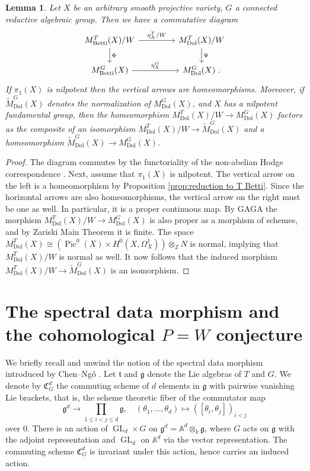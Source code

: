 \documentclass[11pt, a4paper]{amsart}
\newtheorem{lemma}[theorem]{Lemma}
\theoremstyle{definition}
\theoremstyle{myitemstyle}
\newcommand{\Z}{\mathbb{Z}}
\newcommand{\A}{\mathbb{A}}
\DeclareMathOperator{\Pic}{Pic}
\DeclareMathOperator{\GL}{GL}
\newcommand{\Dol}{{\mathrm{Dol}}}
\newcommand{\Betti}{{\mathrm{Betti}}}
\begin{document}
\begin{lemma}\label{lem:non-ab Hodge reduction}
Let $X$ be an arbitrary smooth projective variety, $G$ a connected reductive algebraic group. Then we have a commutative diagram
\begin{equation}
\label{eq:eta for reductive group via tori}
\begin{tikzcd}
    M^{T}_\Betti(X)/W
    \arrow[r,"\eta_X^{T}/W"]
    \arrow[d,"\Phi"]&[2em]
        M^{T}_\Dol(X)/W
        \arrow[d,"\Psi"]\\
    M^G_\Betti(X)
    \arrow[r,"\eta_X^G"]&
        M^G_\Dol(X) \ .
\end{tikzcd}
\end{equation}
If $\pi_1(X)$ is nilpotent then the vertical arrows are homeomorphisms. Moreover, if $\widetilde M^G_\Dol(X)$ denotes the normalization of $M^G_\Dol(X)$, and $X$ has a nilpotent fundamental group, then the  homeomorphism $M^T_\Dol(X)/W\to M^G_\Dol(X)$ factors as the composite of an isomorphism $M^T_\Dol(X)/W\to \widetilde M^G_\Dol(X)$ and a homeomorphism $\widetilde M^G_\Dol(X)\to M^G_\Dol(X)$.
\end{lemma}
\begin{proof}
The diagram commutes by  the functoriality of the non-abelian Hodge correspondence \cite[\S6]{Simpson_nonabelianHodge}.
Next, assume that $\pi_1(X)$ is nilpotent. The vertical arrow on the left is a homeomorphism by Proposition \ref{prop:reduction to T Betti}. Since the horizontal arrows are also homeomorphisms, the vertical arrow on the right must be  one as well. In particular, it is a proper continuous map. By GAGA the morphism $M^T_\Dol(X)/W\to M^G_\Dol(X)$ is also proper as a morphism of schemes, and by Zariski Main Theorem it is finite. The space $M^T_\Dol(X)\cong (\Pic^0(X)\times H^0(X,\Omega^1_X))\otimes_\Z N$ is normal, implying that $M^T_\Dol(X)/W$ is normal as well. It now follows that the induced morphism $M^T_\Dol(X)/W\to \widetilde M^G_\Dol(X)$ is an isomorphism.
\end{proof}

\section{The spectral data morphism and the cohomological $P=W$ conjecture}

We briefly recall and unwind the notion of the spectral data morphism introduced by  Chen--Ng\^o \cite{CN20}.  Let $\mathfrak{t}$ and $\mathfrak{g}$ denote the Lie algebras of $T$ and $G$. We denote by $\mathfrak C_G^d$ the commuting scheme of $d$ elements in $\mathfrak g$ with pairwise vanishing Lie brackets, that is, the scheme theoretic fiber  of the commutator map 
\[
    \mathfrak{g}^d\rightarrow \prod_{1\leq i<j\leq d}\mathfrak{g},\quad (\theta_1,\ldots,\theta_d)\mapsto ([\theta_i,\theta_j])_{i<j}
\]
over $0$.  There is an action of $\GL_d\times G$ on $\mathfrak g^d=\A^d\otimes_k \mathfrak g$, where $G$ acts on $\mathfrak g$ with the adjoint representation and $\GL_d$ on $\A^d$ via the vector representation. The commuting scheme $\mathfrak C_G^d$ is invariant under this action, hence carries an induced action. 
\end{document}
